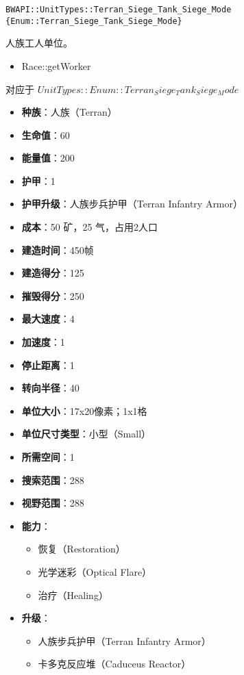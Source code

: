 \begin{tcolorbox}[colback=white, colframe=black!60!white, title=Terran\_Siege\_Tank\_Siege\_Mode(), arc=0mm]
\begin{verbatim}
BWAPI::UnitTypes::Terran_Siege_Tank_Siege_Mode {Enum::Terran_Siege_Tank_Siege_Mode}
\end{verbatim}
人族工人单位。\par
\begin{refer}
    \begin{itemize}
        \item Race::getWorker 
    \end{itemize}
\end{refer}
对应于  $ UnitTypes::Enum::Terran_Siege_Tank_Siege_Mode $ 

\begin{itemize}
    \item \textbf{种族}：人族（Terran）
    \item \textbf{生命值}：60
    \item \textbf{能量值}：200
    \item \textbf{护甲}：1
    \item \textbf{护甲升级}：人族步兵护甲（Terran Infantry Armor）
    \item \textbf{成本}：50 矿，25 气，占用2人口
    \item \textbf{建造时间}：450帧
    \item \textbf{建造得分}：125
    \item \textbf{摧毁得分}：250
    \item \textbf{最大速度}：4
    \item \textbf{加速度}：1
    \item \textbf{停止距离}：1
    \item \textbf{转向半径}：40
    \item \textbf{单位大小}：17x20像素；1x1格
    \item \textbf{单位尺寸类型}：小型（Small）
    \item \textbf{所需空间}：1
    \item \textbf{搜索范围}：288
    \item \textbf{视野范围}：288
    \item \textbf{能力}：
        \begin{itemize}
            \item 恢复（Restoration）
            \item 光学迷彩（Optical Flare）
            \item 治疗（Healing）
        \end{itemize}
    \item \textbf{升级}：
        \begin{itemize}
            \item 人族步兵护甲（Terran Infantry Armor）
            \item 卡多克反应堆（Caduceus Reactor）
        \end{itemize}
    \end{itemize}
\end{tcolorbox}
